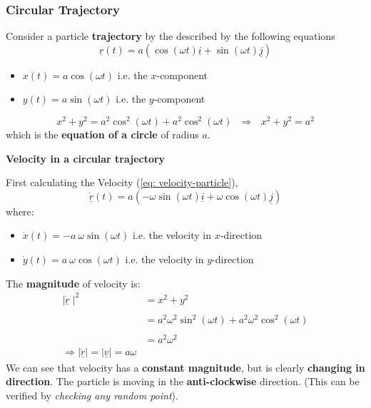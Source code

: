 \subsubsection{Circular Trajectory}
\begin{definition}
	Consider a particle {\bf trajectory} by the described by the following equations
	\begin{equation}
		\label{eq: circular-trajectory}
		\underline{r}(t) = a(\cos(\omega t)\underline{i} + \sin(\omega t)\underline{j})
	\end{equation}
\end{definition}

\begin{itemize}
	\item $x(t) = a\cos(\omega t)$ i.e. the $x$-component
	\item $y(t) = a\sin(\omega t)$ i.e. the $y$-component
\end{itemize}

\begin{note}
	$$x^{2}+ y^{2} = a^{2}\cos^{2}(\omega t) + a^{2}\cos^{2}(\omega t) \ \ \ \Rightarrow \ \ \  x^{2} + y^{2} = a^{2}$$
	which is the {\bf equation of a circle} of radius $a$.

\end{note}

{\bf Velocity in a circular trajectory}

First calculating the Velocity (\ref{eq: velocity-particle}),
$$\underline{\dot{r}}(t) = a(-\omega \sin(\omega t)\underline{i} + \omega\cos(\omega t)\underline{j})$$
where:
\begin{itemize}
	\item $\dot{x}(t) = -a\ \omega\sin(\omega t)$ i.e. the velocity in $x$-direction
	\item $\dot{y}(t) = a\ \omega\cos(\omega t)$ i.e. the velocity in $y$-direction
\end{itemize}
The {\bf magnitude} of velocity is:
$$\begin{aligned} \mid \underline{\dot{r}} \mid^{2} & = x^{2} + y^{2}                                                         \\ \\
                                                  & = a^{2}\omega^{2}\sin^{2}(\omega t) + a^{2}\omega^{2}\cos^{2}(\omega t) \\ \\
                                                  & = a^{2} \omega^{2}                                                      \\
                \Rightarrow\mid\underline{\dot{r}}\mid =  \mid\underline{v}\mid =a\omega\end{aligned}$$
We can see that velocity has a {\bf constant magnitude}, but is clearly {\bf changing in direction}.
The particle is moving in the {\bf anti-clockwise} direction. (This can be verified by \emph{checking any random point}).

